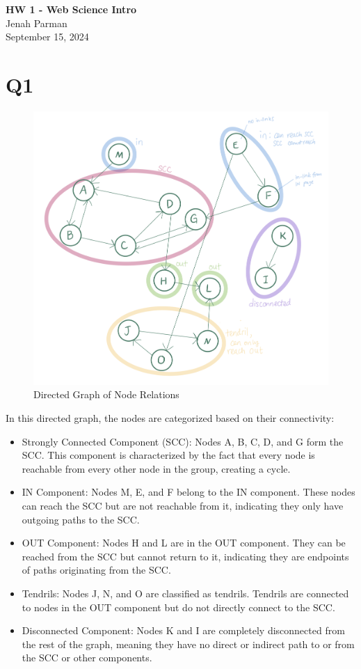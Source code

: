\documentclass[12pt]{article}
\begin{document}
\begin{centering}
{\large\textbf{HW 1 - Web Science Intro}}\\ 
Jenah Parman\\
September 15, 2024\\
\end{centering}


\section*{Q1}

\begin{figure}[!ht]
    \centering
    \includegraphics[height=0.5\linewidth]{directedgraph.png}
    \caption{Directed Graph of Node Relations}
    \label{fig:directedgraph}
\end{figure}

In this directed graph, the nodes are categorized based on their connectivity:

\begin{itemize}
    \item Strongly Connected Component (SCC): Nodes A, B, C, D, and G form the SCC. This component is characterized by the fact that every node is reachable from every other node in the group, creating a cycle.
    \item IN Component: Nodes M, E, and F belong to the IN component. These nodes can reach the SCC but are not reachable from it, indicating they only have outgoing paths to the SCC.
    \item OUT Component: Nodes H and L are in the OUT component. They can be reached from the SCC but cannot return to it, indicating they are endpoints of paths originating from the SCC.
    \item Tendrils: Nodes J, N, and O are classified as tendrils. Tendrils are connected to nodes in the OUT component but do not directly connect to the SCC.
    \item Disconnected Component: Nodes K and I are completely disconnected from the rest of the graph, meaning they have no direct or indirect path to or from the SCC or other components.
\end{itemize}
\end{document}
